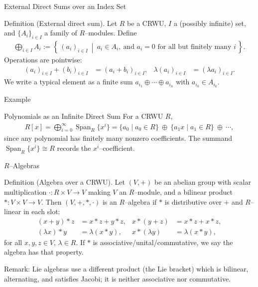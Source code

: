 \begin{frame}{External Direct Sums over an Index Set}
\begin{block}{Definition (External direct sum).}
Let $R$ be a CRWU, $I$ a (possibly infinite) set, and $\{A_i\}_{i\in I}$ a family of $R$–modules.
Define
\begin{align*}
\bigoplus_{i\in I} A_i
:= \left\{\, (a_i)_{i\in I} \ \middle|\ a_i\in A_i,\ \text{and } a_i=0 \text{ for all but finitely many } i \,\right\}.
\end{align*}
Operations are pointwise:
\begin{align*}
(a_i)_{i\in I} + (b_i)_{i\in I} &= (a_i+b_i)_{i\in I},
& \lambda (a_i)_{i\in I} &= (\lambda a_i)_{i\in I}.
\end{align*}
We write a typical element as a finite sum $a_{i_1}\oplus \cdots \oplus a_{i_n}$ with $a_{i_k}\in A_{i_k}$.

\end{block}
\end{frame}

\begin{frame}{Example}
\begin{block}{Polynomials as an Infinite Direct Sum}
    For a CRWU $R$,
\begin{align*}
R[x]
= \bigoplus_{i=0}^\infty \operatorname{Span}_R\{x^i\}
= \{a_0\mid a_0\in R\}\ \oplus\ \{a_1x\mid a_1\in R\}\ \oplus\ \cdots ,
\end{align*}
since any polynomial has finitely many nonzero coefficients. The summand $\operatorname{Span}_R\{x^i\}\cong R$ records the $x^i$–coefficient.
\end{block}
\end{frame}

\begin{frame}{$R$–Algebras}
\vspace{-0.3cm}
\begin{block}{Definition (Algebra over a CRWU).}
Let $(V,+)$ be an abelian group with scalar multiplication $\cdot : R\times V\to V$ making $V$ an $R$–module, and a bilinear product $* : V\times V\to V$.
Then $(V,+,*,\cdot)$ is an $R$–algebra if $*$ is distributive over $+$ and $R$–linear in each slot:
\vspace{-0.3cm}
\begin{align*}
(x+y)*z &= x*z + y*z, & x*(y+z) &= x*z + x*z,\\
(\lambda x)*y &= \lambda (x*y), & x*(\lambda y) &= \lambda (x*y),
\end{align*}
for all $x,y,z\in V$, $\lambda\in R$. If $*$ is associative/unital/commutative, we say the algebra has that property.
\end{block}
\vspace{-0.3cm}
\begin{block}{Remark:} Lie algebras use a different product (the Lie bracket) which is bilinear, alternating, and satisfies Jacobi; it is neither associative nor commutative.
\end{block}
\end{frame}

